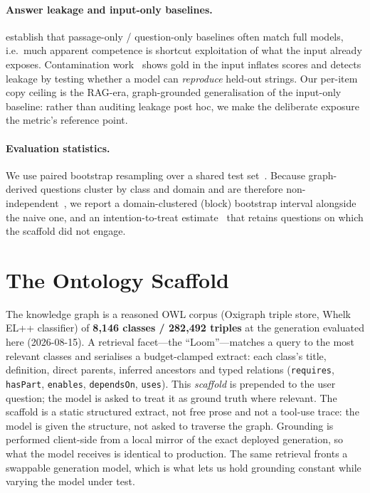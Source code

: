 \documentclass[11pt]{article}
\begin{document}
\paragraph{Answer leakage and input-only baselines.}
\textcite{kaushik2018reading} establish that passage-only / question-only baselines often match
full models, i.e.\ much apparent competence is shortcut exploitation of what the input already
exposes. Contamination work~\cite{sainz2023contamination,golchin2024timetravel} shows gold in
the input inflates scores and detects leakage by testing whether a model can \emph{reproduce}
held-out strings. Our per-item copy ceiling is the RAG-era, graph-grounded generalisation of the
input-only baseline: rather than auditing leakage post hoc, we make the deliberate exposure the
metric's reference point.

\paragraph{Evaluation statistics.}
We use paired bootstrap resampling over a shared test set~\cite{efron1979bootstrap,koehn2004significance}.
Because graph-derived questions cluster by class and domain and are therefore
non-independent~\cite{dror2018hitchhiker}, we report a domain-clustered (block) bootstrap
interval alongside the naive one, and an intention-to-treat estimate~\cite{hollis1999itt} that
retains questions on which the scaffold did not engage.

\section{The Ontology Scaffold}\label{sec:scaffold}
The knowledge graph is a reasoned OWL corpus (Oxigraph triple store, Whelk EL++ classifier)
of \textbf{8{,}146 classes / 282{,}492 triples} at the generation evaluated here
(2026-08-15). A retrieval facet---the ``Loom''---matches a query to the most relevant classes
and serialises a budget-clamped extract: each class's title, definition, direct parents,
inferred ancestors and typed relations (\texttt{requires}, \texttt{hasPart}, \texttt{enables},
\texttt{dependsOn}, \texttt{uses}). This \emph{scaffold} is prepended to the user question; the
model is asked to treat it as ground truth where relevant. The scaffold is a static structured
extract, not free prose and not a tool-use trace: the model is given the structure, not asked to
traverse the graph. Grounding is performed client-side from a local mirror of the exact deployed
generation, so what the model receives is identical to production. The same retrieval fronts a
swappable generation model, which is what lets us hold grounding constant while varying the model
under test.
\end{document}
